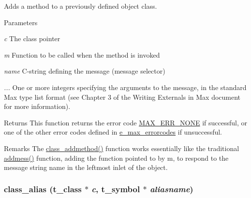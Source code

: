 Adds a method to a previously defined object class. 
\begin{DoxyParams}{Parameters}
\item[{\em c}]The class pointer \item[{\em m}]Function to be called when the method is invoked \item[{\em name}]C-\/string defining the message (message selector) \item[{\em ...}]One or more integers specifying the arguments to the message, in the standard Max type list format (see Chapter 3 of the Writing Externals in Max document for more information).\end{DoxyParams}
\begin{DoxyReturn}{Returns}
This function returns the error code \hyperlink{group__misc_gga0764dd6c02b76cca7d053ae50555d69da6d22f77fef8b1e1b074cef5d29d935fd}{MAX\_\-ERR\_\-NONE} if successful, or one of the other error codes defined in \hyperlink{group__misc_ga0764dd6c02b76cca7d053ae50555d69d}{e\_\-max\_\-errorcodes} if unsuccessful.
\end{DoxyReturn}
\begin{DoxyRemark}{Remarks}
The \hyperlink{group__class_ga1fabf54e0cec8d4e5f732fa347b3f874}{class\_\-addmethod()} function works essentially like the traditional \hyperlink{group__class__old_ga0d9bfa416fdd861d1b2fd2d17701cbb3}{addmess()} function, adding the function pointed to by {\ttfamily m}, to respond to the message string {\ttfamily name} in the leftmost inlet of the object. 
\end{DoxyRemark}
\hypertarget{group__class_gab6f0ce5c584100e70106404e6068ac0d}{
\subsubsection[{class\_\-alias}]{ class\_\-alias ({\bf t\_\-class} $\ast$ {\em c}, \/  {\bf t\_\-symbol} $\ast$ {\em aliasname})}}
\label{group__class_gab6f0ce5c584100e70106404e6068ac0d}


